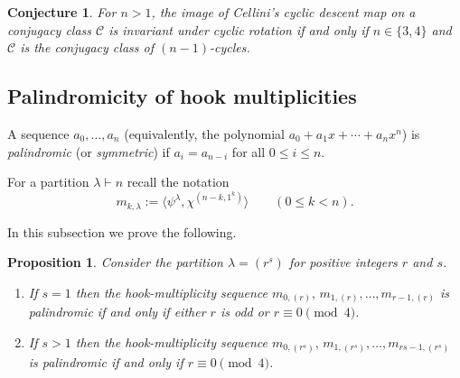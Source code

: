 \documentclass[10pt]{article}
\newtheorem{proposition}[theorem]{Proposition}
\newtheorem{conjecture}[theorem]{Conjecture}
\theoremstyle{definition}
\newcommand{\C}{\mathcal C}
\begin{document}
\begin{conjecture} 
    For $n > 1$, the image of Cellini's cyclic descent map on a conjugacy class $\C$ is invariant under cyclic rotation if and only if $n \in \{3,4\}$ and $\C$ is the conjugacy class of $(n-1)$-cycles.
\end{conjecture}


\subsection{Palindromicity of hook multiplicities}
\label{sec:palindrom}	

A sequence $a_0,\ldots,a_n$ (equivalently, the polynomial $a_0+a_1x+\cdots+a_nx^n$) is 	
{\em palindromic} (or {\em symmetric})
if $a_i=a_{n-i}$ for all $0 \le i \le n$. 

For a partition $\lambda\vdash n$ recall the notation
\[
    m_{k,\lambda}
    := \langle \psi^{\lambda},\chi^{(n-k,1^k)} \rangle 
    \qquad (0\le k<n).
\]

In this subsection we prove the following. 

\begin{proposition}\label{conj:r2}
    Consider the partition $\lambda = (r^s)$ for positive integers $r$ and $s$.
    \begin{enumerate}
        \item 
        If $s=1$ then the hook-multiplicity sequence  $m_{0,(r)},\,m_{1,(r)},\ldots, m_{r-1,(r)}$ is palindromic if and only if either $r$ is odd or $r\equiv 0 \pmod 4$. 

        \item
        If $s>1$ then the hook-multiplicity sequence $m_{0,(r^s)},\,m_{1,(r^s)},\ldots, m_{rs-1,(r^s)}$ is palindromic if and only if $r\equiv 0 \pmod 4$.
    \end{enumerate}
\end{proposition}
\end{document}
